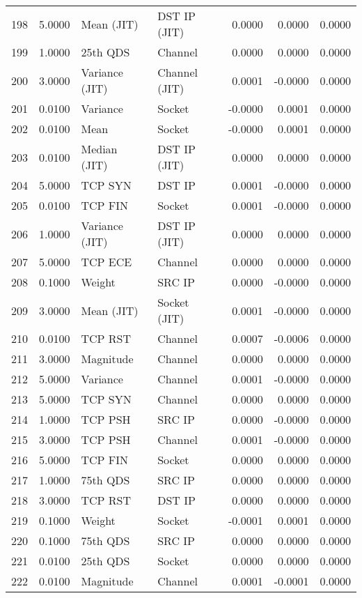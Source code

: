 \begin{longtable}{lrllrrr}
198 & 5.0000 & Mean (JIT) & DST IP (JIT) & 0.0000 & 0.0000 & 0.0000 \\
199 & 1.0000 & 25th QDS & Channel & 0.0000 & 0.0000 & 0.0000 \\
200 & 3.0000 & Variance (JIT) & Channel (JIT) & 0.0001 & -0.0000 & 0.0000 \\
201 & 0.0100 & Variance & Socket & -0.0000 & 0.0001 & 0.0000 \\
202 & 0.0100 & Mean & Socket & -0.0000 & 0.0001 & 0.0000 \\
203 & 0.0100 & Median (JIT) & DST IP (JIT) & 0.0000 & 0.0000 & 0.0000 \\
204 & 5.0000 & TCP SYN & DST IP & 0.0001 & -0.0000 & 0.0000 \\
205 & 0.0100 & TCP FIN & Socket & 0.0001 & -0.0000 & 0.0000 \\
206 & 1.0000 & Variance (JIT) & DST IP (JIT) & 0.0000 & 0.0000 & 0.0000 \\
207 & 5.0000 & TCP ECE & Channel & 0.0000 & 0.0000 & 0.0000 \\
208 & 0.1000 & Weight & SRC IP & 0.0000 & -0.0000 & 0.0000 \\
209 & 3.0000 & Mean (JIT) & Socket (JIT) & 0.0001 & -0.0000 & 0.0000 \\
210 & 0.0100 & TCP RST & Channel & 0.0007 & -0.0006 & 0.0000 \\
211 & 3.0000 & Magnitude & Channel & 0.0000 & 0.0000 & 0.0000 \\
212 & 5.0000 & Variance & Channel & 0.0001 & -0.0000 & 0.0000 \\
213 & 5.0000 & TCP SYN & Channel & 0.0000 & 0.0000 & 0.0000 \\
214 & 1.0000 & TCP PSH & SRC IP & 0.0000 & -0.0000 & 0.0000 \\
215 & 3.0000 & TCP PSH & Channel & 0.0001 & -0.0000 & 0.0000 \\
216 & 5.0000 & TCP FIN & Socket & 0.0000 & 0.0000 & 0.0000 \\
217 & 1.0000 & 75th QDS & SRC IP & 0.0000 & 0.0000 & 0.0000 \\
218 & 3.0000 & TCP RST & DST IP & 0.0000 & 0.0000 & 0.0000 \\
219 & 0.1000 & Weight & Socket & -0.0001 & 0.0001 & 0.0000 \\
220 & 0.1000 & 75th QDS & SRC IP & 0.0000 & 0.0000 & 0.0000 \\
221 & 0.0100 & 25th QDS & Socket & 0.0000 & 0.0000 & 0.0000 \\
222 & 0.0100 & Magnitude & Channel & 0.0001 & -0.0001 & 0.0000 \\

\end{longtable}
